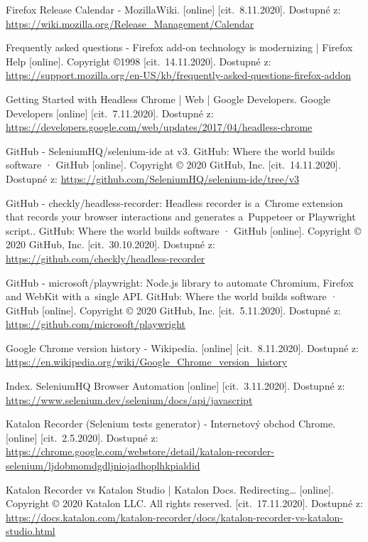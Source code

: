 \begin{thebibliography}{99}
 Firefox Release Calendar - MozillaWiki. [online] [cit.~8.11.2020]. Dostupné z: \url{https://wiki.mozilla.org/Release_Management/Calendar}

 Frequently asked questions - Firefox add-on technology is modernizing | Firefox Help [online]. Copyright ©1998 [cit.~14.11.2020]. Dostupné z: \url{https://support.mozilla.org/en-US/kb/frequently-asked-questions-firefox-addon}

 Getting Started with Headless Chrome  |  Web  |  Google Developers. Google Developers [online] [cit.~7.11.2020]. Dostupné z: \url{https://developers.google.com/web/updates/2017/04/headless-chrome}

 GitHub - SeleniumHQ/selenium-ide at v3. GitHub: Where the world builds software · GitHub [online]. Copyright © 2020 GitHub, Inc. [cit.~14.11.2020]. Dostupné z: \url{https://github.com/SeleniumHQ/selenium-ide/tree/v3}

 GitHub - checkly/headless-recorder: Headless recorder is a~Chrome extension that records your browser interactions and generates a~Puppeteer or Playwright script.. GitHub: Where the world builds software · GitHub [online]. Copyright © 2020 GitHub, Inc. [cit.~30.10.2020]. Dostupné z: \url{https://github.com/checkly/headless-recorder}

 GitHub - microsoft/playwright: Node.js library to automate Chromium, Firefox and WebKit with a~single API. GitHub: Where the world builds software · GitHub [online]. Copyright © 2020 GitHub, Inc. [cit.~5.11.2020]. Dostupné z: \url{https://github.com/microsoft/playwright}

 Google Chrome version history - Wikipedia. [online] [cit.~8.11.2020]. Dostupné z: \url{https://en.wikipedia.org/wiki/Google_Chrome_version_history}

 Index. SeleniumHQ Browser Automation [online] [cit.~3.11.2020]. Dostupné z: \url{https://www.selenium.dev/selenium/docs/api/javascript}

 Katalon Recorder (Selenium tests generator) - Internetový obchod Chrome. [online] [cit.~2.5.2020]. Dostupné z: \url{https://chrome.google.com/webstore/detail/katalon-recorder-selenium/ljdobmomdgdljniojadhoplhkpialdid}

 Katalon Recorder vs Katalon Studio | Katalon Docs. Redirecting… [online]. Copyright © 2020 Katalon LLC. All rights reserved. [cit.~17.11.2020]. Dostupné z: \url{https://docs.katalon.com/katalon-recorder/docs/katalon-recorder-vs-katalon-studio.html}


\end{thebibliography}
